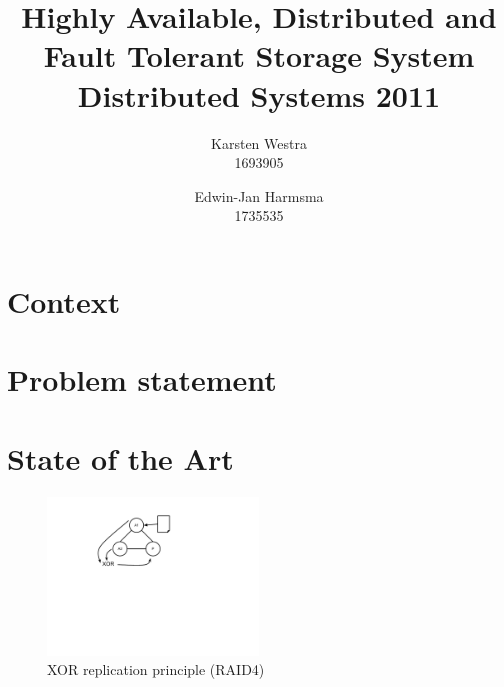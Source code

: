 \documentclass[12pt,a4paper]{scrartcl}
\title{\large{Highly Available, Distributed and Fault Tolerant Storage System} \\ \normalsize{Distributed Systems 2011}}
\author{Karsten Westra\\1693905 \and Edwin-Jan Harmsma\\1735535}
\begin{document}
\maketitle

\tableofcontents
\clearpage



\section{Context}

\section{Problem statement}

\section{State of the Art}
\label{sec:state-of-the-art}

\begin{figure}[H]
\centering
\includegraphics[width=0.5\textwidth,trim=4cm 8cm 8cm 1cm,clip=true]{diagrams/xor-replication.pdf}
\caption{XOR replication principle (RAID4)}
\label{fig:xor-replication}
\end{figure}

\end{document}
